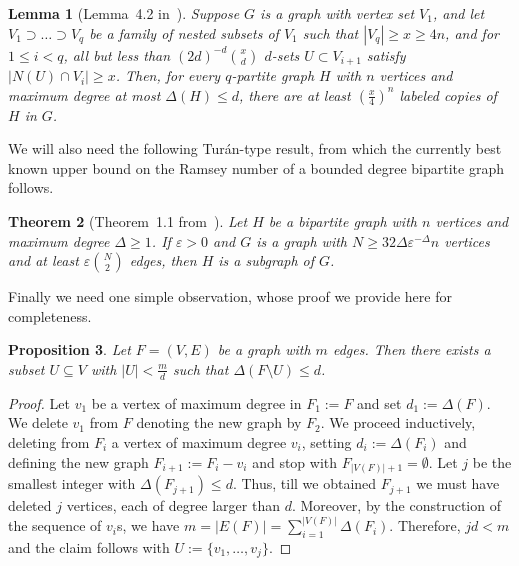 \documentclass[reqno]{amsart}
\newtheorem{theorem}                   {Theorem}%
\newtheorem{lemma}           [theorem] {Lemma}
\newtheorem{proposition}     [theorem] {Proposition}
\theoremstyle{remark}
\newcommand{\eps}{\varepsilon}
\begin{document}
\begin{lemma}[Lemma~4.2 in~\cite{FoxSud09a}]\label{lem:embed}
Suppose $G$ is a graph with vertex set $V_1$, and let $V_1 \supset \ldots \supset V_q$ be a family of nested subsets 
of $V_1$ such that $|V_q| \geq x \geq 4n$, and for $1 \leq i <q$, all but less than $(2d)^{-d} \binom{x}{d}$ $d$-sets 
$U \subset V_{i+1}$ satisfy $|N(U) \cap V_i| \geq x$. Then, for every $q$-partite graph $H$ with $n$ vertices and maximum 
degree at most $\Delta(H) \leq d$, there are at least $\left( \tfrac{x}{4} \right)^n$ labeled copies of $H$ in $G$. 
\end{lemma}

We will also need the following Tur\'an-type result, from which the currently best known upper bound on the Ramsey number of a bounded degree bipartite graph follows.
\begin{theorem}[Theorem~1.1 from~\cite{FoxSud09a}]\label{thm:densityresult}
Let $H$ be a bipartite graph with $n$ vertices and maximum degree $\Delta \geq 1$. 
If $\eps > 0$ and $G$ is a graph with $N \geq 32 \Delta \eps^{- \Delta} n$ vertices and at 
least $\eps \binom{N}{2}$ edges, then $H$ is a subgraph of $G$.
\end{theorem}

Finally we need one simple observation, whose proof we provide here for completeness.
\begin{proposition}\label{prop:bddeg}
 Let $F=(V,E)$ be a graph with $m$ edges. Then there exists a subset $U\subseteq V$ with $|U|< \tfrac{m}{d}$ such that $\Delta(F\setminus U)\le d$.
\end{proposition}
\begin{proof}
Let $v_1$ be a vertex of maximum degree in $F_1:=F$ and set $d_1:=\Delta(F)$. 
We delete $v_1$ from $F$ denoting the new graph by $F_2$. We proceed inductively,
deleting from $F_i$ a vertex of maximum degree $v_{i}$, setting $d_{i}:=\Delta(F_i)$ 
and defining the new graph $F_{i+1}:=F_i-v_{i}$ and stop with $F_{|V(F)|+1}=\emptyset$. 
Let $j$ be the smallest integer with $\Delta(F_{j+1})\le d$. 
Thus, till we obtained $F_{j+1}$ we must have deleted $j$ vertices, each of degree larger than $d$. 
Moreover, by the construction of the sequence of $v_i$s, 
we have $m=|E(F)|=\sum_{i=1}^{|V(F)|}\Delta(F_{i})$. Therefore, $jd< m$ and the claim follows with $U:=\{v_1,\ldots,v_j\}$.
\end{proof}
\end{document}
